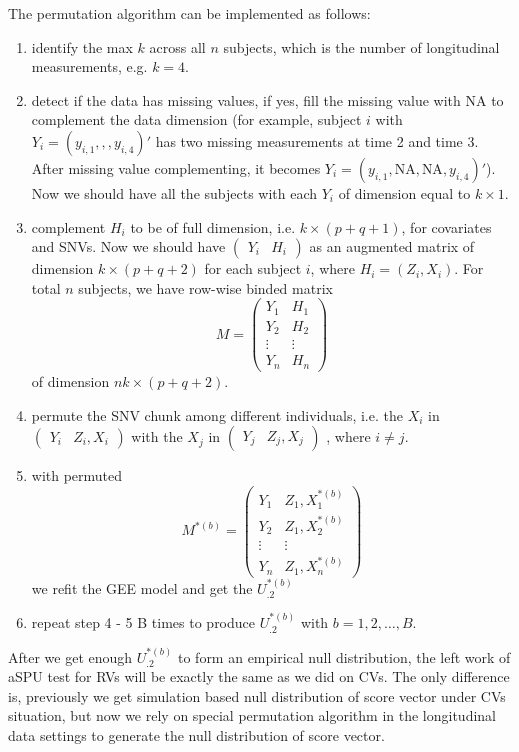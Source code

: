 \documentclass[compress]{beamer}
\begin{document}
{\framebreak
The permutation algorithm can be implemented as follows:
\begin{enumerate}
\item identify the max $k$ across all $n$ subjects, which is the number of longitudinal measurements, e.g. $k = 4$.
\item detect if the data has missing values, if yes, fill the missing value with NA to complement the data dimension (for example, subject $i$ with $Y_{i} = ( y_{i,1},,,y_{i,4} )'$ has two missing measurements at time 2 and time 3. After missing value complementing, it becomes $Y_{i} = ( y_{i,1},\textrm{NA},\textrm{NA},y_{i,4} )'$). Now we should have all the subjects with each $Y_{i}$ of dimension equal to $k \times 1$.  
\item complement $H_i$ to be of full dimension, i.e. $k \times (p + q + 1)$, for covariates and SNVs. Now we should have
$\begin{pmatrix}
Y_i & H_i
\end{pmatrix}$
as an augmented matrix of dimension $k \times (p + q + 2)$ for each subject $i$, where $H_i = (Z_i,X_i)$. For total $n$ subjects, we have row-wise binded matrix
$$
M = 
\begin{pmatrix}
Y_1 & H_1\\
Y_2 & H_2\\
\vdots & \vdots\\
Y_n & H_n
\end{pmatrix}
$$ 
of dimension $nk \times (p + q + 2)$.
\item permute the SNV chunk among different individuals, i.e. the $X_i$ in
$\begin{pmatrix}
Y_i & Z_i,X_i
\end{pmatrix}$ 
with the $X_j$ in 
$\begin{pmatrix}
Y_j & Z_j,X_j
\end{pmatrix}$
, where $i \neq j$. 
\item with permuted 
$$
M^{*(b)} = 
\begin{pmatrix}
Y_1 & Z_1, X_1^{*(b)}\\
Y_2 & Z_1, X_2^{*(b)}\\
\vdots & \vdots\\
Y_n & Z_1, X_n^{*(b)}
\end{pmatrix}
$$
we refit the GEE model and get the $ U_{.2}^{ *(b) } $
\item repeat step 4 - 5 B times to produce $U_{.2}^{ *(b) }$ with $b = 1,2,\ldots,B$.
\end{enumerate}
After we get enough $U_{.2}^{ *(b) }$ to form an empirical null distribution, the left work of aSPU test for RVs will be exactly the same as we did on CVs. The only difference is, previously we get simulation based null distribution of score vector under CVs situation, but now we rely on special permutation algorithm in the longitudinal data settings to generate the null distribution of score vector.
}
\end{document}

